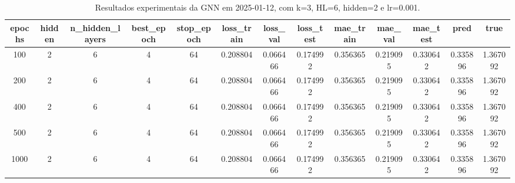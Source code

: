 \begin{table}[h]
\centering
\caption{Resultados experimentais da GNN em 2025-01-12, com k=3, HL=6, hidden=2 e lr=0.001.}
\label{tab:gnn_results_k3_hl6_h2_d20250112}
\begin{tabular}{ccccccccccccc}
\toprule
epochs & hidden & n\_hidden\_layers & best\_epoch & stop\_epoch & loss\_train & loss\_val & loss\_test & mae\_train & mae\_val & mae\_test & pred & true \\
\midrule
100 & 2 & 6 & 4 & 64 & 0.208804 & 0.066466 & 0.174992 & 0.356365 & 0.219095 & 0.330642 & 0.335896 & 1.367092 \\
200 & 2 & 6 & 4 & 64 & 0.208804 & 0.066466 & 0.174992 & 0.356365 & 0.219095 & 0.330642 & 0.335896 & 1.367092 \\
400 & 2 & 6 & 4 & 64 & 0.208804 & 0.066466 & 0.174992 & 0.356365 & 0.219095 & 0.330642 & 0.335896 & 1.367092 \\
500 & 2 & 6 & 4 & 64 & 0.208804 & 0.066466 & 0.174992 & 0.356365 & 0.219095 & 0.330642 & 0.335896 & 1.367092 \\
1000 & 2 & 6 & 4 & 64 & 0.208804 & 0.066466 & 0.174992 & 0.356365 & 0.219095 & 0.330642 & 0.335896 & 1.367092 \\
\bottomrule
\end{tabular}
\end{table}
